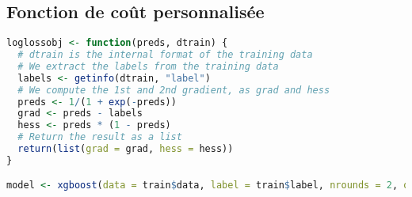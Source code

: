 \subsection{Fonction de coût personnalisée}
\begin{lstlisting}[language=R]
loglossobj <- function(preds, dtrain) {
  # dtrain is the internal format of the training data
  # We extract the labels from the training data
  labels <- getinfo(dtrain, "label")
  # We compute the 1st and 2nd gradient, as grad and hess
  preds <- 1/(1 + exp(-preds))
  grad <- preds - labels
  hess <- preds * (1 - preds)
  # Return the result as a list
  return(list(grad = grad, hess = hess))
}

model <- xgboost(data = train$data, label = train$label, nrounds = 2, objective = loglossobj, eval_metric = "error")
\end{lstlisting}